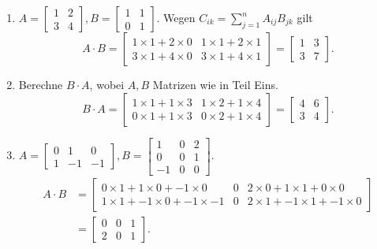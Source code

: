 \documentclass[fleqn,draft,a5paper]{article}
\theoremstyle{remark}
\begin{document}
\begin{enumerate}
\item \(A =
  \begin{bmatrix}
    1 & 2 \\ 3 & 4
  \end{bmatrix},
  B =
  \begin{bmatrix}
    1 & 1 \\ 0 & 1
  \end{bmatrix}.
  \)
  Wegen \(C_{ik} = \sum_{j=1}^{n}{A_{ij}B_{jk}}\) gilt
\[A \cdot B =
  \begin{bmatrix}
    1 \times 1 + 2 \times 0 & 1 \times 1 + 2 \times 1 \\
    3 \times 1 + 4 \times 0 & 3 \times 1 + 4 \times 1
  \end{bmatrix} =
  \begin{bmatrix}
    1 & 3 \\ 3 & 7
  \end{bmatrix}.
  \]
\item Berechne \(B \cdot A\), wobei \(A, B\) Matrizen wie in Teil Eins.
  \[B \cdot A =
    \begin{bmatrix}
      1 \times 1 + 1 \times 3 & 1 \times 2 + 1 \times 4 \\ 0 \times 1 + 1 \times 3 & 0 \times 2 + 1 \times 4
    \end{bmatrix}
    =
    \begin{bmatrix}
      4 & 6 \\ 3 & 4
    \end{bmatrix}.
  \]
\item \(A =
  \begin{bmatrix}
    0 & 1 & 0 \\ 1 & -1 & -1
  \end{bmatrix},
  B =
  \begin{bmatrix}
    1 & 0 & 2 \\ 0 & 0 & 1 \\  -1 & 0 & 0
  \end{bmatrix}.
  \)
  \begin{align*}
    A \cdot B
    &=
    \begin{bmatrix}
      0 \times 1 + 1 \times 0 + -1 \times 0
      & 0
      & 2 \times 0 + 1 \times 1 + 0 \times 0 \\
      1 \times 1 + -1 \times 0 + -1 \times -1
      & 0
      & 2 \times 1 + -1 \times 1 + -1 \times 0
    \end{bmatrix} \\
    &=
    \begin{bmatrix}
      0 & 0 & 1 \\ 2 & 0 & 1
    \end{bmatrix}.
  \end{align*}
\end{enumerate}
\end{document}

